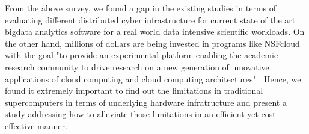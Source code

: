 From the above survey, we found a gap in the existing studies in terms of evaluating different distributed cyber infrastructure for current state of the art bigdata analytics software for a real world data intensive scientific workloads.
On the other hand, millions of dollars are being invested in programs like NSFcloud with the goal "to provide an experimental platform enabling the academic research community to drive research on a new generation of innovative applications of cloud computing and cloud computing architectures" \cite{nsfcloud} . 
Hence, we found it extremely important to find out the limitations in traditional supercomputers in terms of underlying hardware infratructure and present a study addressing how to alleviate those limitations in an efficient yet cost-effective manner.





